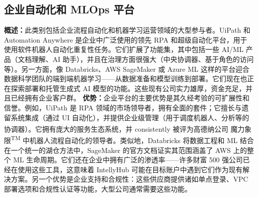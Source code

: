 \documentclass[11点, A4纸, 单面]{article}
\begin{document}
\subsection{企业自动化和 MLOps 平台}

\textbf{概述：}此类别包括企业流程自动化和机器学习运营领域的大型参与者。UiPath 和 Automation Anywhere 是企业中广泛使用的领先 RPA 和超级自动化平台，用于使用软件机器人自动化重复性任务。它们扩展了功能集，其中包括一些 AI/ML 产品（文档理解、AI 助手），并且在治理方面很强大（中央协调器、基于角色的访问等）。另一方面，像 Databricks、AWS SageMaker 或 Azure ML 这样的平台迎合数据科学团队的端到端机器学习——从数据准备和模型训练到部署。它们现在也正在探索部署和托管生成式 AI 模型的功能。这些现有公司实力雄厚，资金充足，并且已经拥有企业客户群。
\newline\newline
\textbf{优势：}企业平台的主要优势是其久经考验的可扩展性和信誉。例如，UiPath 是 RPA 领域的市场领导者，拥有全面的套件；它擅长与遗留系统集成（通过 UI 自动化），并提供企业级管理（用于调度机器人、分析等的协调器）。它拥有庞大的服务生态系统，并 consistently 被评为高德纳公司\textsuperscript{\textregistered} 魔力象限\textsuperscript{TM} 中机器人流程自动化的领导者\cite{uipathGartner}。类似地，Databricks 将数据工程和 ML 结合在一个统一的湖仓方法中，SageMaker 的官方文档证实其范围涵盖了 AWS 上的整个 ML 生命周期\cite{awsSagemaker}。它们还在企业中拥有广泛的渗透率——许多财富 500 强公司已经在使用这些工具，这意味着 IntellyHub 可能在目标账户中遇到它们作为现有解决方案。另一个优势是企业支持和合规性：这些供应商提供诸如单点登录、VPC 部署选项和合规性认证等功能，大型公司通常需要这些功能。
\newline\newline
\end{document}
